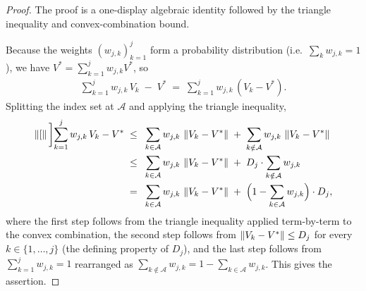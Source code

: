 \begin{proof}
The proof is a one-display algebraic identity followed by the triangle
inequality and convex-combination bound.

Because the weights $(w_{j,k})_{k=1}^{j}$ form a probability distribution
(i.e.\ $\sum_{k} w_{j,k} = 1$), we have
$V^* = \sum_{k=1}^{j} w_{j,k} V^*$, so
\begin{align*}
   \sum_{k=1}^{j} w_{j,k}\, V_k \;-\; V^*
   \;=\; \sum_{k=1}^{j} w_{j,k} \, (V_k - V^*).
\end{align*}
Splitting the index set at $\mathcal A$ and applying the triangle
inequality,
\begin{align*}
   \left\| [ \right\|\bigg]{\sum_{k=1}^{j} w_{j,k}\, V_k - V^*}
   \;\le\; & ~ \sum_{k \in \mathcal A} w_{j,k}\, \left\| V_k - V^* \right\|
              \;+\; \sum_{k \notin \mathcal A} w_{j,k}\, \left\| V_k - V^* \right\| \\
   \;\le\; & ~ \sum_{k \in \mathcal A} w_{j,k}\, \left\| V_k - V^* \right\|
              \;+\; D_j \cdot \sum_{k \notin \mathcal A} w_{j,k} \\
   \;=\; & ~ \sum_{k \in \mathcal A} w_{j,k}\, \left\| V_k - V^* \right\|
              \;+\; \Big(1 - \sum_{k \in \mathcal A} w_{j,k}\Big) \cdot D_j,
\end{align*}
where the first step follows from the triangle inequality applied
term-by-term to the convex combination, the second step follows from
$\left\| V_k - V^* \right\| \le D_j$ for every $k \in \{1, \dots, j\}$ (the
defining property of $D_j$), and the last step follows from
$\sum_{k=1}^{j} w_{j,k} = 1$ rearranged as
$\sum_{k \notin \mathcal A} w_{j,k} = 1 - \sum_{k \in \mathcal A} w_{j,k}$.
This gives the assertion.
\end{proof}
